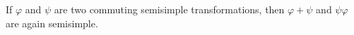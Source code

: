 If $\varphi$ and $\psi$ are two commuting semisimple transformations, then $\varphi + \psi$ and $\psi \varphi$ are again semisimple.

